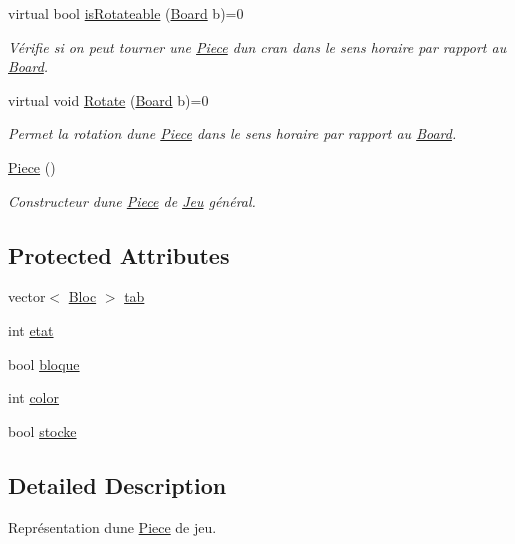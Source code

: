 \begin{DoxyCompactItemize}
virtual bool \hyperlink{classPiece_a56cdf7f4234fe848a3e203b693b7a862}{is\+Rotateable} (\hyperlink{classBoard}{Board} b)=0
\begin{DoxyCompactList}\small\item\em Vérifie si on peut tourner une \hyperlink{classPiece}{Piece} d\textquotesingle{}un cran dans le sens horaire par rapport au \hyperlink{classBoard}{Board}. \end{DoxyCompactList}\item 
virtual void \hyperlink{classPiece_a078f3cc6281cb8f60af3ae2266c651ba}{Rotate} (\hyperlink{classBoard}{Board} b)=0
\begin{DoxyCompactList}\small\item\em Permet la rotation d\textquotesingle{}une \hyperlink{classPiece}{Piece} dans le sens horaire par rapport au \hyperlink{classBoard}{Board}. \end{DoxyCompactList}\item 
\mbox{\label{classPiece_ac57de5803bbad829b143bc7268267dc1}} 
\hyperlink{classPiece_ac57de5803bbad829b143bc7268267dc1}{Piece} ()
\begin{DoxyCompactList}\small\item\em Constructeur d\textquotesingle{}une \hyperlink{classPiece}{Piece} de \hyperlink{classJeu}{Jeu} général. \end{DoxyCompactList}\end{DoxyCompactItemize}
\subsection*{Protected Attributes}
\begin{DoxyCompactItemize}
\item 
vector$<$ \hyperlink{classBloc}{Bloc} $>$ \hyperlink{classPiece_a9ea65e906b9ef0c30594f4f5aa5ed444}{tab}
\item 
int \hyperlink{classPiece_a9632e25aa0e79f8161451a937ccfc7ad}{etat}
\item 
bool \hyperlink{classPiece_a99b4e2bbf91e0e609fc5141135a2e0ad}{bloque}
\item 
int \hyperlink{classPiece_a4268f3b047e1ad284882708b85332ef1}{color}
\item 
bool \hyperlink{classPiece_af0c815c20f2000c02b6d7ce5b6703651}{stocke}
\end{DoxyCompactItemize}


\subsection{Detailed Description}
Représentation d\textquotesingle{}une \hyperlink{classPiece}{Piece} de jeu. 

